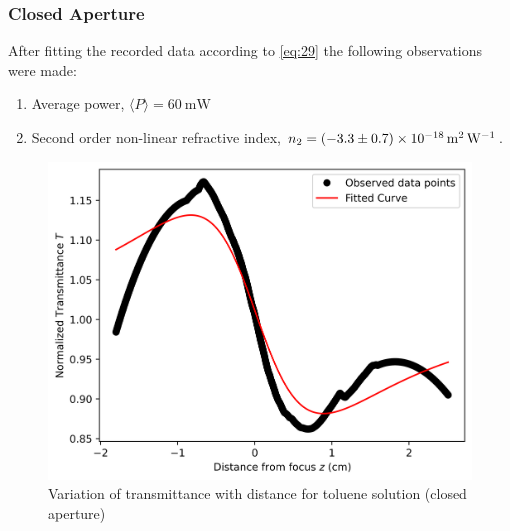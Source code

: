 \documentclass[%
 reprint,
 amsmath,amssymb,
 aps,
]{revtex4-2}
\begin{document}
		\subsubsection{Closed Aperture}
			After fitting the recorded data according to \eqref{eq:29} the following observations were made:
			\begin{enumerate} 
				\item Average power, $ \langle P \rangle  = \SI{60}{\milli \watt}$
				\item Second order non-linear refractive index, $ n_2 = \SI[separate-uncertainty=true]{-3.3 \pm 0.7e-18}{\meter \squared \per \watt} $.
			\end{enumerate}
			\begin{figure}
				\includegraphics[scale = 0.59]{tol-c}
				\caption{Variation of transmittance with distance for toluene solution (closed aperture)}
			\end{figure}
		
\end{document}
